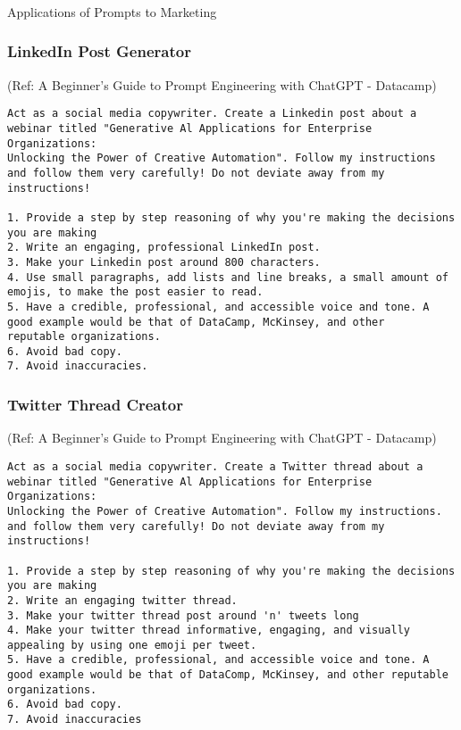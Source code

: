 
\begin{frame}[fragile]\frametitle{}
\begin{center}
{\Large Applications of Prompts to Marketing}
\end{center}
\end{frame}



\begin{frame}[fragile]\frametitle{LinkedIn Post Generator}

{\tiny (Ref: A Beginner's Guide to Prompt Engineering with ChatGPT - Datacamp)}


\begin{lstlisting}
Act as a social media copywriter. Create a Linkedin post about a
webinar titled "Generative Al Applications for Enterprise Organizations:
Unlocking the Power of Creative Automation". Follow my instructions
and follow them very carefully! Do not deviate away from my
instructions!

1. Provide a step by step reasoning of why you're making the decisions
you are making
2. Write an engaging, professional LinkedIn post.
3. Make your Linkedin post around 800 characters.
4. Use small paragraphs, add lists and line breaks, a small amount of
emojis, to make the post easier to read.
5. Have a credible, professional, and accessible voice and tone. A
good example would be that of DataCamp, McKinsey, and other
reputable organizations.
6. Avoid bad copy.
7. Avoid inaccuracies.
\end{lstlisting}		
		

\end{frame}

\begin{frame}[fragile]\frametitle{Twitter Thread Creator}

{\tiny (Ref: A Beginner's Guide to Prompt Engineering with ChatGPT - Datacamp)}


\begin{lstlisting}
Act as a social media copywriter. Create a Twitter thread about a
webinar titled "Generative Al Applications for Enterprise Organizations:
Unlocking the Power of Creative Automation". Follow my instructions.
and follow them very carefully! Do not deviate away from my
instructions!

1. Provide a step by step reasoning of why you're making the decisions
you are making
2. Write an engaging twitter thread.
3. Make your twitter thread post around 'n' tweets long
4. Make your twitter thread informative, engaging, and visually
appealing by using one emoji per tweet.
5. Have a credible, professional, and accessible voice and tone. A
good example would be that of DataComp, McKinsey, and other reputable organizations.
6. Avoid bad copy.
7. Avoid inaccuracies
\end{lstlisting}		
		

\end{frame}

